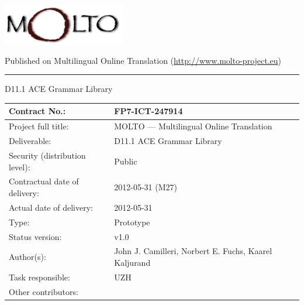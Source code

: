 \thispagestyle{empty}

\begin{minipage}{0.99\textwidth}
\begin{flushleft}
\includegraphics[width=0.4\textwidth]{molto_logo}

{\normalsize Published on Multilingual Online Translation (\url{http://www.molto-project.eu})}
\end{flushleft}
\end{minipage}

\rule[15pt]{0.9\textwidth}{0.5pt}

{\LARGE D11.1 ACE Grammar Library}

\begin{center}
\begin{tabular}{ | l | l | }
\hline
Contract No.: & FP7-ICT-247914 \\
\hline
Project full title: & MOLTO --- Multilingual Online Translation \\
\hline
Deliverable: & D11.1 ACE Grammar Library \\
\hline
Security (distribution level): & Public \\
\hline
Contractual date of delivery: & 2012-05-31 (M27) \\
\hline
Actual date of delivery: & 2012-05-31 \\
\hline
Type: & Prototype \\
\hline
Status version: & v1.0 \\
\hline
Author(s): & John J. Camilleri, Norbert E. Fuchs, Kaarel Kaljurand \\
\hline
Task responsible: & UZH \\
\hline
Other contributors: & \\
\hline
\end{tabular}
\end{center}
